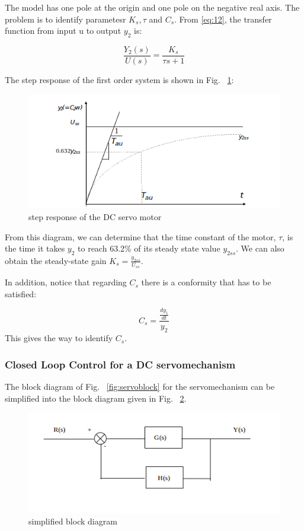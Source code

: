 \documentclass[11pt,a4paper]{article}
\begin{document}
The model has one pole at the origin and one pole on the negative real axis. The problem is to identify parametesr $K_{s}, \tau$ and $C_{s}$. From \ref{eq:12}, the transfer function from input u to output $y_{2}$ is:

\begin{equation} \label{eq:13}
\frac{Y_{2}(s)}{U(s)} = \frac{K_{s}}{\tau s + 1}
\end{equation}

The step response of the first order system is shown in Fig. ~\ref{fig:servostepresp}:

\begin{figure}[here]
\includegraphics[width=\textwidth]{imglab/servostepresponse.png}
\caption{step response of the DC servo motor}
\label{fig:servostepresp}
\end{figure}

From this diagram, we can determine that the time constant of the motor, $\tau$, is the time it takes $y_{2}$ to reach 63.2\% of its steady state value $y_{2ss}$. We can also obtain the steady-state gain $K_{s} = \frac{y_{2ss}}{U_{ss}}$.

In addition, notice that regarding $C_{s}$ there is a conformity that has to be satisfied:

\begin{equation} \label{eq:14}
C_{s} = \frac{\frac{dy_{1}}{dt}}{y_2}
\end{equation}
This gives the way to identify $C_{s}$.

\subsubsection{Closed Loop Control for a DC servomechanism}
The block diagram of Fig. ~\ref{fig:servoblock} for the servomechanism can be simplified into the block diagram given in Fig. ~\ref{fig:servotfblock}.

\begin{figure}[here]
\includegraphics{imglab/servotfblock.png}
\caption{simplified block diagram}
\label{fig:servotfblock}
\end{figure}
\end{document}
